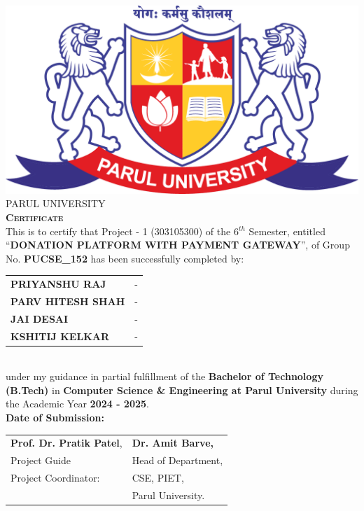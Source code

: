 \newpage  %
\thispagestyle{plain}  %

\begin{center}
    \includegraphics[scale=0.13]{./images/parullogo.png} \\[0.7cm]
    
    {\Huge \textsc{\color{violet}PARUL UNIVERSITY}}\\[0.8cm]
    
    {\Huge \bf \textsc{\color{teal}Certificate}}\\[0.5cm]
    
    \large
    This is to certify that Project - 1 (303105300) of the 6$^{th}$ Semester, entitled “\textbf{DONATION PLATFORM WITH PAYMENT GATEWAY}”, of Group No. \textbf{PUCSE\_152} has been successfully completed by:\\[0.5cm]
\end{center}

\noindent
\begin{tabular}{ll}
    \textbf{PRIYANSHU RAJ} & -  \\
    \textbf{PARV HITESH SHAH} & -  \\
    \textbf{JAI DESAI} & -  \\
    \textbf{KSHITIJ KELKAR} & -  \\
\end{tabular}\\[0.5cm]

\noindent
under my guidance in partial fulfillment of the \textbf{Bachelor of Technology (B.Tech)} in \textbf{Computer Science \& Engineering at Parul University} during the Academic Year \textbf{2024 - 2025}.\\[1cm]

\noindent
\textbf{Date of Submission:} \underline{\hspace{7cm}} \\[1cm]

\vspace{1cm}
\noindent
\begin{tabular}{p{11cm}p{11cm}}
    \color{brown} \textbf{Prof. Dr. Pratik Patel}, & \color{brown} \textbf{Dr. Amit Barve,}  \\ 
    Project Guide & Head of Department,  \\  
    Project Coordinator: & CSE, PIET, \\
    & Parul University. \\  
\end{tabular}

\newpage  %
